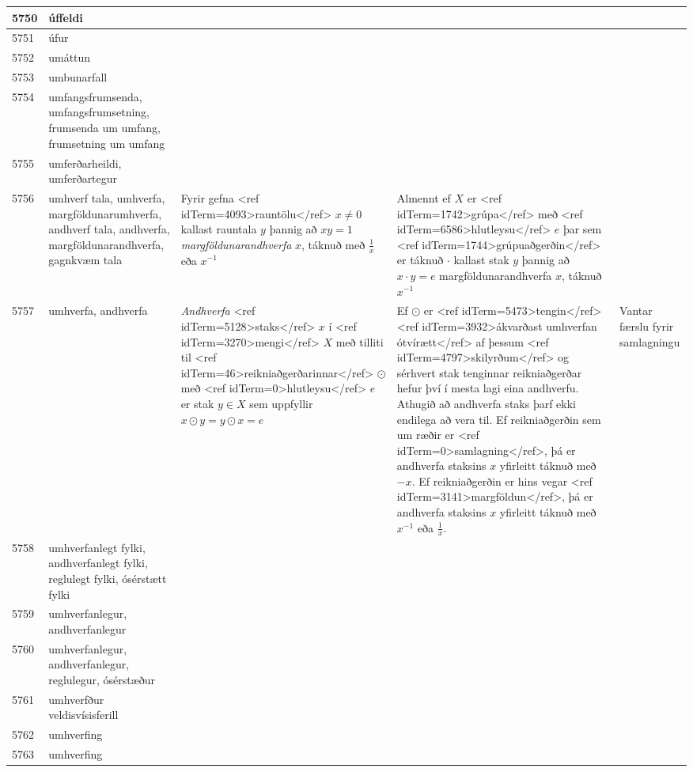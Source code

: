 \begin{longtable}{p{}|p{}|p{}|p{}|p{}}
\hline
5750 & úffeldi &  &  &  \\
\hline
5751 & úfur &  &  &  \\
\hline
5752 & umáttun &  &  &  \\
\hline
5753 & umbunarfall &  &  &  \\
\hline
5754 & umfangsfrumsenda, umfangsfrumsetning, frumsenda um umfang, frumsetning um umfang &  &  &  \\
\hline
5755 & umferðarheildi, umferðartegur &  &  &  \\
\hline
5756 & umhverf tala, umhverfa, margföldunarumhverfa, andhverf tala, andhverfa, margföldunarandhverfa, gagnkvæm tala & Fyrir gefna <ref idTerm=4093>rauntölu</ref> $x \neq 0$ kallast rauntala $y$ þannig að $xy=1$ \textit{margföldunarandhverfa} $x$, táknuð með $\frac1x$ eða $x^{-1}$ & Almennt ef $X$ er <ref idTerm=1742>grúpa</ref> með <ref idTerm=6586>hlutleysu</ref> $e$ þar sem <ref idTerm=1744>grúpuaðgerðin</ref> er táknuð $\cdot$ kallast stak $y$ þannig að $x \cdot y=e$ margföldunarandhverfa $x$, táknuð $x^{-1}$ & \\
\hline
5757 & umhverfa, andhverfa & \textit{Andhverfa} <ref idTerm=5128>staks</ref> $x$ í <ref idTerm=3270>mengi</ref> $X$ með tilliti til <ref idTerm=46>reikniaðgerðarinnar</ref> $\odot$ með <ref idTerm=0>hlutleysu</ref> $e$ er stak $y \in X$ sem uppfyllir $x \odot y = y \odot x = e$ & Ef $\odot$ er <ref idTerm=5473>tengin</ref> <ref idTerm=3932>ákvarðast umhverfan ótvírætt</ref> af þessum <ref idTerm=4797>skilyrðum</ref> og sérhvert stak tenginnar reikniaðgerðar hefur því í mesta lagi eina andhverfu. Athugið að andhverfa staks þarf ekki endilega að vera til. Ef reikniaðgerðin sem um ræðir er <ref idTerm=0>samlagning</ref>, þá er andhverfa staksins $x$ yfirleitt táknuð með $-x$. Ef reikniaðgerðin er hins vegar <ref idTerm=3141>margföldun</ref>, þá er andhverfa staksins $x$ yfirleitt táknuð með $x^{-1}$ eða $\frac1x$. & Vantar færslu fyrir samlagningu \\
\hline
5758 & umhverfanlegt fylki, andhverfanlegt fylki, reglulegt fylki, ósérstætt fylki &  &  &  \\
\hline
5759 & umhverfanlegur, andhverfanlegur &  &  &  \\
\hline
5760 & umhverfanlegur, andhverfanlegur, reglulegur, ósérstæður &  &  &  \\
\hline
5761 & umhverfður veldisvísisferill &  &  &  \\
\hline
5762 & umhverfing &  &  &  \\
\hline
5763 & umhverfing &  &  &  \\

\end{longtable}
